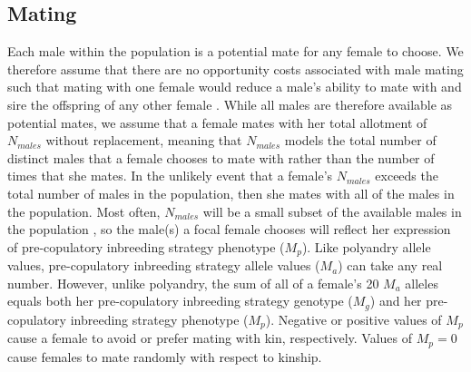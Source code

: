 \documentclass[10pt,letterpaper]{article}
\begin{document}
\subsection*{Mating}

Each male within the population is a potential mate for any female to choose. We therefore assume that there are no opportunity costs associated with male mating such that mating with one female would reduce a male's ability to mate with and sire the offspring of any other female \cite[e.g.,][]{Waser1986}. While all males are therefore available as potential mates, we assume that a female mates with her total allotment of $N_{males}$ without replacement, meaning that $N_{males}$ models the total number of distinct males that a female chooses to mate with rather than the number of times that she mates. In the unlikely event that a female's $N_{males}$ exceeds the total number of males in the population, then she mates with all of the males in the population. Most often, $N_{males}$ will be a small subset of the available males in the population \cite[][]{Duthie}, so the male(s) a focal female chooses will reflect her expression of pre-copulatory inbreeding strategy phenotype ($M_{p}$). Like polyandry allele values, pre-copulatory inbreeding strategy allele values ($M_{a}$) can take any real number. However, unlike polyandry, the sum of all of a female's 20 $M_{a}$ alleles equals both her pre-copulatory inbreeding strategy genotype ($M_{g}$) and her pre-copulatory inbreeding strategy phenotype ($M_{p}$). Negative or positive values of $M_{p}$ cause a female to avoid or prefer mating with kin, respectively. Values of $M_{p}=0$ cause females to mate randomly with respect to kinship.
\end{document}
